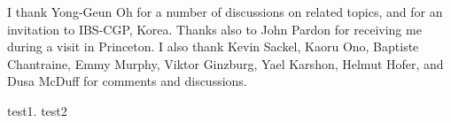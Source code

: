 I thank Yong-Geun Oh for a number of discussions 
on related topics, and for an invitation to 
IBS-CGP, Korea. Thanks also to John Pardon for 
receiving me during a visit in Princeton. I also 
thank Kevin Sackel, Kaoru Ono, Baptiste Chantraine, Emmy Murphy, Viktor Ginzburg, Yael Karshon, Helmut Hofer, 
and Dusa McDuff for comments and discussions. 

test1. test2

